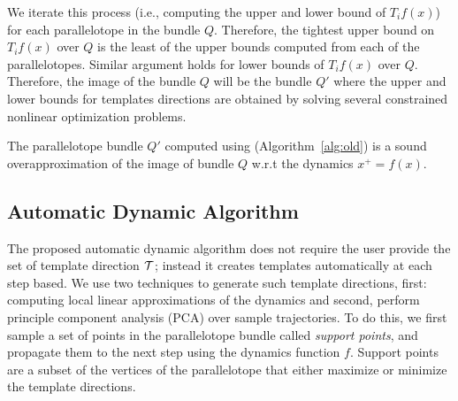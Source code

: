 We iterate this process (i.e., computing the upper and lower bound of $T_{i}f(x)$) for each parallelotope in the bundle $Q$.
%
%
Therefore, the tightest upper bound on $T_{i}f(x)$ over $Q$ is the least of the upper bounds computed from each of the parallelotopes.
%
Similar argument holds for lower bounds of $T_{i}f(x)$ over $Q$.
%
Therefore, the image of the bundle $Q$ will be the bundle $Q'$ where the upper and lower bounds for templates directions are obtained by solving several constrained nonlinear optimization problems.

\begin{lemma}
\label{lem:correctness}
The parallelotope bundle $Q'$ computed using \tbundle (Algorithm~\ref{alg:old}) is a sound overapproximation of the image of bundle $Q$ w.r.t the dynamics $x^{+} = f(x)$.
\end{lemma}




\vspace{-1.5em}
\subsection{Automatic Dynamic Algorithm}

The proposed automatic dynamic algorithm does not require the user provide the set of template direction ${\cal T}$; instead it creates templates automatically at each step based.
%
We use two techniques to generate such template directions, first: computing local linear approximations of the dynamics and second, perform principle component analysis (PCA) over sample trajectories.
%
To do this, we first sample a set of points in the parallelotope bundle called \emph{support points}, and propagate them to the next step using the dynamics function $f$.
%
Support points are a subset of the vertices of the parallelotope that either maximize or minimize the template directions.

